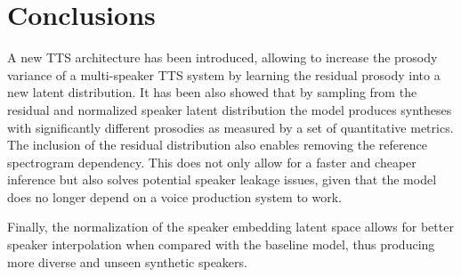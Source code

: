 \section{Conclusions}


A new TTS architecture has been introduced, allowing to increase the prosody variance of a multi-speaker TTS system by learning the residual prosody into a new latent distribution. It has been also showed that by sampling from the residual and normalized speaker latent distribution the model produces syntheses with significantly different prosodies as measured by a set of quantitative metrics. The inclusion of the residual distribution also enables removing the reference spectrogram dependency. This does not only     allow for a faster and  cheaper inference but also solves potential speaker leakage issues, given that the model does no longer depend on a voice production system to work.


Finally, the normalization of the speaker embedding latent space allows for better speaker interpolation when compared with the baseline model, thus producing more diverse and unseen synthetic speakers.


